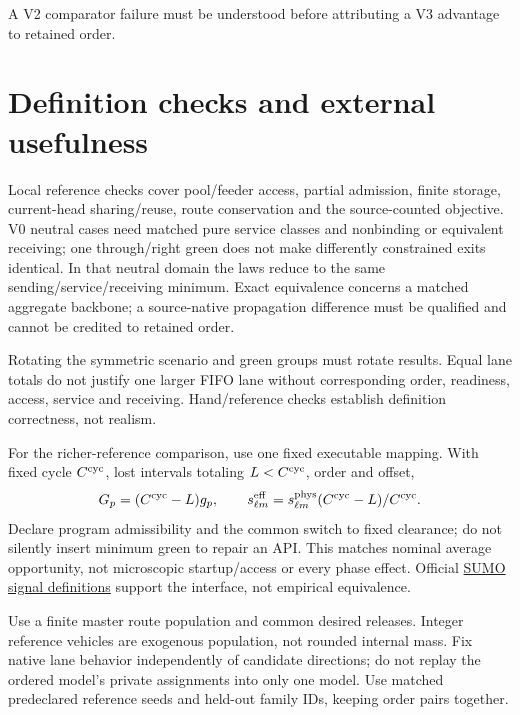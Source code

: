 \documentclass[10pt,a4paper]{article}
\begin{document}
A V2 comparator failure must be understood before attributing a V3
advantage to retained order.

\section{Definition checks and external usefulness}

Local reference checks cover pool/feeder access, partial admission,
finite storage, current-head
sharing/reuse, route conservation and the source-counted objective.
V0 neutral cases need matched pure service classes and nonbinding or
equivalent receiving; one through/right green does not make differently
constrained exits identical. In that neutral domain the laws reduce to
the same sending/service/receiving minimum. Exact equivalence concerns
a matched aggregate backbone; a source-native propagation difference
must be qualified and cannot be credited to retained order.

Rotating the symmetric scenario and green groups must rotate results.
Equal lane totals do not justify one larger FIFO lane without
corresponding order, readiness, access, service and receiving.
Hand/reference checks establish definition correctness, not realism.

\textcolor{revisionred}{For the richer-reference comparison, use one fixed executable mapping.} With fixed cycle
$C^{\rm cyc}$, lost intervals totaling $L<C^{\rm cyc}$, order and offset,
\begin{equation}
 G_p=(C^{\rm cyc}-L)g_p,\qquad
 s^{\rm eff}_{\ell m}=s^{\rm phys}_{\ell m}
                         (C^{\rm cyc}-L)/C^{\rm cyc}.
 \label{eq:reference-action}
\end{equation}
Declare program admissibility and the common switch to fixed clearance;
do not silently insert minimum green to repair an API.
This matches nominal average opportunity, not microscopic startup/access
or every phase effect. Official
\href{https://sumo.dlr.de/docs/Simulation/Traffic_Lights.html}
{SUMO signal definitions} support the interface, not empirical equivalence.

Use a finite master route population and common desired releases.
Integer reference vehicles are exogenous population, not rounded internal
mass. Fix native lane behavior independently of candidate directions;
do not replay the ordered model's private assignments into only one model.
Use matched predeclared reference seeds and held-out family IDs,
keeping order pairs together.
\end{document}
